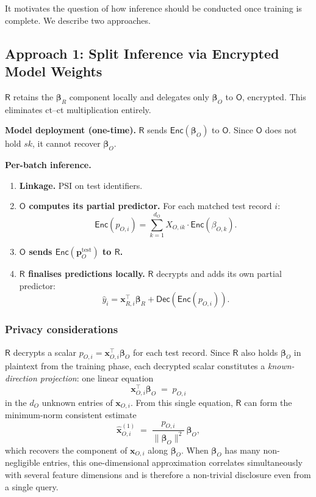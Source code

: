 \documentclass[12pt]{article}
\theoremstyle{definition}
\theoremstyle{plain}
\newcommand{\Enc}[1]{\mathsf{Enc}\!\left(#1\right)}
\newcommand{\Dec}[1]{\mathsf{Dec}\!\left(#1\right)}
\newcommand{\bbeta}{\boldsymbol{\beta}}
\newcommand{\Party}[1]{\textsf{#1}}
\newcommand{\sk}{\mathit{sk}}
\begin{document}
It motivates the question of how inference should be conducted once training is complete. We describe two approaches.

\subsection{Approach 1: Split Inference via Encrypted Model Weights}
\label{sec:inf:split}

$\Party{R}$ retains the $\bbeta_{R}$ component locally and delegates only $\bbeta_{O}$ to $\Party{O}$, encrypted. This eliminates ct--ct multiplication entirely.

\textbf{Model deployment (one-time).}
$\Party{R}$ sends $\Enc{\bbeta_{O}}$ to $\Party{O}$. Since $\Party{O}$ does not hold $\sk$, it cannot recover $\bbeta_{O}$.

\textbf{Per-batch inference.}

\begin{enumerate}[noitemsep, label=\textbf{Step \arabic*.}]
  \item \textbf{Linkage.} PSI on test identifiers.
  \item \textbf{$\Party{O}$ computes its partial predictor.} For each matched test record $i$:
  \begin{equation}
    \Enc{p_{O,i}} = \sum_{k=1}^{d_{O}} X_{O,ik} \cdot \Enc{\beta_{O,k}}.
  \end{equation}
  
  \item \textbf{$\Party{O}$ sends $\Enc{\mathbf{p}_{O}^{\mathrm{test}}}$ to $\Party{R}$.}
  \item \textbf{$\Party{R}$ finalises predictions locally.} $\Party{R}$ decrypts and adds its own partial predictor:
  \begin{equation}
    \hat{y}_{i} = \mathbf{x}_{R,i}^{\top}\bbeta_{R} + \Dec{\Enc{p_{O,i}}}.
  \end{equation}
\end{enumerate}

\subsubsection{Privacy considerations}

$\Party{R}$ decrypts a scalar $p_{O,i} = \mathbf{x}_{O,i}^{\top}
\bbeta_{O}$ for each test record. Since $\Party{R}$ also holds $\bbeta_{O}$
in plaintext from the training phase, each decrypted scalar constitutes a
\emph{known-direction projection}: one linear equation
\[
  \mathbf{x}_{O,i}^{\top}\bbeta_{O} \;=\; p_{O,i}
\]
in the $d_{O}$ unknown entries of $\mathbf{x}_{O,i}$. From this single
equation, $\Party{R}$ can form the minimum-norm consistent estimate
\[
  \hat{\mathbf{x}}_{O,i}^{(1)}
  \;=\; \frac{p_{O,i}}{\|\bbeta_{O}\|^{2}}\,\bbeta_{O},
\]
which recovers the component of $\mathbf{x}_{O,i}$ along $\bbeta_{O}$.
When $\bbeta_{O}$ has many non-negligible entries, this one-dimensional
approximation correlates simultaneously with several feature dimensions
and is therefore a non-trivial disclosure even from a single query.
\end{document}
